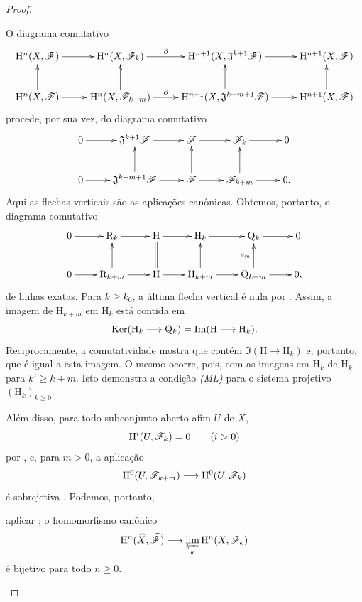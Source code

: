 \begin{proof}
\begin{env}[4.1.7.21]
\label{III.4.1.7.21}
O diagrama comutativo
\[
  \xymatrix@C=2.5em{
    \HH^n(X,\sh{F})
      \ar[r]
    &
    \HH^n(X,\sh{F}_k)
      \ar[r]^-{\partial}
    &
    \HH^{n+1}(X,\mathfrak{J}^{k+1}\sh{F})
      \ar[r]
    &
    \HH^{n+1}(X,\sh{F})
    \\
    \HH^n(X,\sh{F})
      \ar[r]\ar[u]
    &
    \HH^n(X,\sh{F}_{k+m})
      \ar[r]^-{\partial}\ar[u]
    &
    \HH^{n+1}(X,\mathfrak{J}^{k+m+1}\sh{F})
      \ar[r]\ar[u]
    &
    \HH^{n+1}(X,\sh{F})
      \ar[u]
  }
\]
procede, por sua vez, do diagrama comutativo
\[
  \xymatrix{
    0\ar[r]
    &
    \mathfrak{J}^{k+1}\sh{F}\ar[r]
    &
    \sh{F}\ar[r]
    &
    \sh{F}_k\ar[r]
    &
    0
    \\
    0\ar[r]
    &
    \mathfrak{J}^{k+m+1}\sh{F}\ar[r]\ar[u]
    &
    \sh{F}\ar[r]\ar[u]
    &
    \sh{F}_{k+m}\ar[r]\ar[u]
    &
    0.
  }
\]
Aqui as flechas verticais são as aplicações canônicas.
Obtemos, portanto, o diagrama comutativo
\[
  \xymatrix@C=2.2em{
    0\ar[r]
    &
    \mathrm{R}_k\ar[r]
    &
    \mathrm{H}\ar[r]
    &
    \mathrm{H}_k\ar[r]
    &
    \mathrm{Q}_k\ar[r]
    &
    0
    \\
    0\ar[r]
    &
    \mathrm{R}_{k+m}\ar[r]\ar[u]
    &
    \mathrm{H}\ar[r]\ar@{=}[u]
    &
    \mathrm{H}_{k+m}\ar[r]\ar[u]
    &
    \mathrm{Q}_{k+m}\ar[r]\ar[u]^{\nu_m}
    &
    0,
  }
\]
de linhas exatas.
Para $k\geq k_0$, a última flecha vertical é nula por
.
Assim, a imagem de $\mathrm{H}_{k+m}$ em $\mathrm{H}_k$ está contida
em
\[
  \operatorname{Ker}(\mathrm{H}_k\longrightarrow\mathrm{Q}_k)
  =
  \operatorname{Im}(\mathrm{H}\longrightarrow\mathrm{H}_k).
\]
Reciprocamente, a comutatividade mostra que contém
$\Im(\mathrm{H}\to\mathrm{H}_k)$ e, portanto, que é igual a esta
imagem.
O mesmo ocorre, pois, com as imagens em $\mathrm{H}_k$ de
$\mathrm{H}_{k'}$ para $k'\geq k+m$.
Isto demonstra a condição \emph{(ML)} para o sistema projetivo
$(\mathrm{H}_k)_{k\geq0}$.

Além disso, para todo subconjunto aberto afim $U$ de $X$,
\[
  \mathrm{H}^i(U,\mathscr{F}_k)=0
  \qquad(i>0)
\]
por , e, para $m>0$, a aplicação
\[
  \mathrm{H}^0(U,\mathscr{F}_{k+m})
  \longrightarrow
  \mathrm{H}^0(U,\mathscr{F}_k)
\]
é sobrejetiva .
Podemos, portanto,


aplicar ; o homomorfismo canônico
\[
  \mathrm{H}^n(\widehat{X},\widehat{\mathscr{F}})
  \longrightarrow
  \varprojlim_k\mathrm{H}^n(X,\mathscr{F}_k)
\]
é bijetivo para todo $n\geq0$.


\end{env}
\end{proof}
